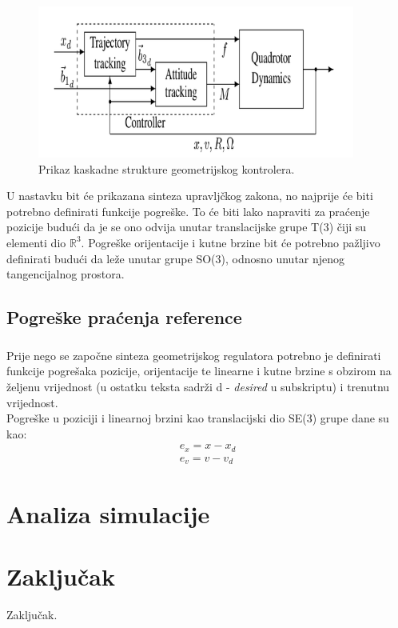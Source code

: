 \documentclass[times, utf8, diplomski]{fer}
\begin{document}
	\newpage
	\clearpage

	\begin{figure}[h!]
		\includegraphics[width=\textwidth, height=5cm]{controller.png}
		\caption{Prikaz kaskadne strukture geometrijskog kontrolera.}
	\end{figure}
	
	U nastavku bit će prikazana sinteza upravljčkog zakona, no najprije će biti potrebno definirati funkcije pogreške. To će biti lako napraviti za praćenje pozicije budući da je se ono odvija unutar translacijske grupe T(3) čiji su elementi dio $\mathbb{R}^3$. Pogreške orijentacije i kutne brzine bit će potrebno pažljivo definirati budući da leže unutar grupe SO(3), odnosno unutar njenog tangencijalnog prostora.
	
\section{Pogreške praćenja reference}

	\paragraph{}Prije nego se započne sinteza geometrijskog regulatora potrebno je definirati funkcije pogrešaka pozicije, orijentacije te linearne i kutne brzine s obzirom na željenu vrijednost (u ostatku teksta sadrži d - \textit{desired} u subskriptu) i trenutnu vrijednost. \\
	Pogreške u poziciji i linearnoj brzini kao translacijski dio SE(3) grupe dane su kao:
	\begin{gather}
		e_x = x - x_d \\
		e_v = v - v_d
	\end{gather}
	
\chapter{Analiza simulacije}
\chapter{Zaključak}
Zaključak.
\end{document}
